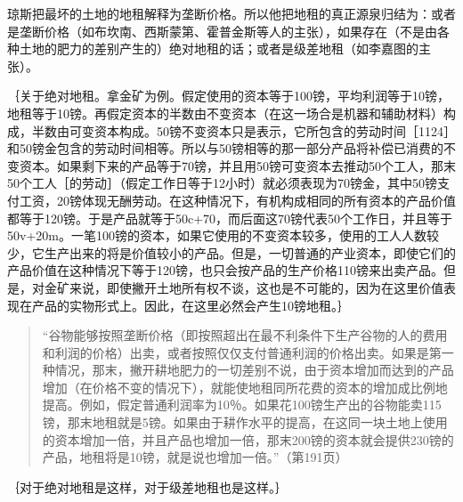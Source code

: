 琼斯把最坏的土地的地租解释为垄断价格。所以他把地租的真正源泉归结为：或者是垄断价格（如布坎南、西斯蒙第、霍普金斯等人的主张），如果存在（不是由各种土地的肥力的差别产生的）绝对地租的话；或者是级差地租（如李嘉图的主张）。

｛关于绝对地租。拿金矿为例。假定使用的资本等于100镑，平均利润等于10镑，地租等于10镑。再假定资本的半数由不变资本（在这一场合是机器和辅助材料）构成，半数由可变资本构成。50镑不变资本只是表示，它所包含的劳动时间［1124］和50镑金包含的劳动时间相等。所以与50镑相等的那一部分产品将补偿已消费的不变资本。如果剩下来的产品等于70镑，并且用50镑可变资本去推动50个工人，那末50个工人［的劳动］（假定工作日等于12小时）就必须表现为70镑金，其中50镑支付工资，20镑体现无酬劳动。在这种情况下，有机构成相同的所有资本的产品价值都等于120镑。于是产品就等于50c+70，而后面这70镑代表50个工作日，并且等于50v+20m。一笔100镑的资本，如果它使用的不变资本较多，使用的工人人数较少，它生产出来的将是价值较小的产品。但是，一切普通的产业资本，即使它们的产品价值在这种情况下等于120镑，也只会按产品的生产价格110镑来出卖产品。但是，对金矿来说，即使撇开土地所有权不谈，这也是不可能的，因为在这里价值表现在产品的实物形式上。因此，在这里必然会产生10镑地租。｝

\begin{quote}{“谷物能够按照垄断价格（即按照超出在最不利条件下生产谷物的人的费用和利润的价格）出卖，或者按照仅仅支付普通利润的价格出卖。如果是第一种情况，那末，撇开耕地肥力的一切差别不说，由于资本增加而达到的产品增加（在价格不变的情况下），就能使地租同所花费的资本的增加成比例地提高。例如，假定普通利润率为10％。如果花100镑生产出的谷物能卖115镑，那末地租就是5镑。如果由于耕作水平的提高，在这同一块土地上使用的资本增加一倍，并且产品也增加一倍，那末200镑的资本就会提供230镑的产品，地租将是10镑，就是说也增加一倍。”（第191页）}\end{quote}

｛对于绝对地租是这样，对于级差地租也是这样。｝

